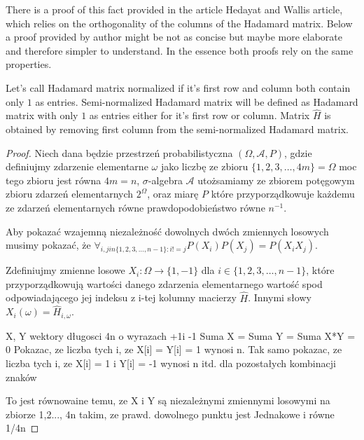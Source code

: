 There is a proof of this fact provided in the article Hedayat and Wallis article, which relies on the orthogonality of the columns of the Hadamard matrix. Below a proof provided by author might be not as concise but maybe more elaborate and therefore simpler to understand. In the essence both proofs rely on the same properties. 

Let's call Hadamard matrix normalized if it's first row and column both contain only $1$ as entries. Semi-normalized Hadamard matrix will be defined as Hadamard matrix with only $1$ as entries either for it's first row or column. Matrix $\hat{H}$ is obtained by removing first column from the semi-normalized Hadamard matrix.

\begin{proof}
Niech dana będzie przestrzeń probabilistyczna $(\Omega, \mathcal{A}, P)$, gdzie definiujmy zdarzenie elementarne $\omega$ jako liczbę ze zbioru $\{1,2,3, \dots, 4m\} = \Omega$ moc tego zbioru jest równa $4m=n$, $\sigma$-algebra $\mathcal{A}$ utożsamiamy ze zbiorem potęgowym zbioru zdarzeń elementarnych $2^{\Omega}$, oraz miarę $P$ które przyporządkowuje każdemu ze zdarzeń elementarnych równe prawdopodobieństwo równe $n^{-1}$.

Aby pokazać wzajemną niezależność dowolnych dwóch zmiennych losowych musimy pokazać, że $\forall_{i,j in \{1,2,3, \dots, n-1\} \colon i!=j} P(X_i)P(X_j) = P(X_iX_j)$.

Zdefiniujmy zmienne losowe $X_i \colon \Omega \to \{1,-1\}$ dla $i \in \{1, 2, 3, \dots, n-1\}$, które przyporządkowują wartości danego zdarzenia elementarnego wartość spod odpowiadającego jej indeksu z i-tej kolumny macierzy $\hat{H}$. Innymi słowy $X_i(\omega) = \hat{H}_{i,\omega}$.

X, Y wektory długosci 4n o wyrazach +1i -1
Suma X = Suma Y = Suma X*Y = 0
Pokazac, ze liczba tych i, ze X[i] = Y[i] = 1 wynosi n.
Tak samo pokazac, ze liczba tych i, ze X[i] = 1 i Y[i] = -1 wynosi n itd. dla pozostałych kombinacji znaków 

To jest równowaine temu, ze X i Y są niezależnymi zmiennymi losowymi na zbiorze {1,2..., 4n} takim, ze prawd. dowolnego punktu jest Jednakowe i równe 1/4n

\end{proof}

